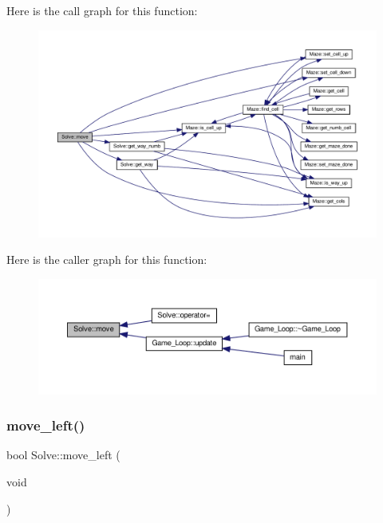 Here is the call graph for this function\+:\nopagebreak
\begin{figure}[H]
\begin{center}
\leavevmode
\includegraphics[width=350pt]{classSolve_a8902b46862c7759928495e3684054f82_cgraph}
\end{center}
\end{figure}
Here is the caller graph for this function\+:\nopagebreak
\begin{figure}[H]
\begin{center}
\leavevmode
\includegraphics[width=350pt]{classSolve_a8902b46862c7759928495e3684054f82_icgraph}
\end{center}
\end{figure}
\mbox{\label{classSolve_a8226032eb1d4877539f417d4fab0efde}} 
\subsubsection{\texorpdfstring{move\+\_\+left()}{move\_left()}}
{\footnotesize\ttfamily bool Solve\+::move\+\_\+left (\begin{DoxyParamCaption}\item[{void}]{ }\end{DoxyParamCaption})}



